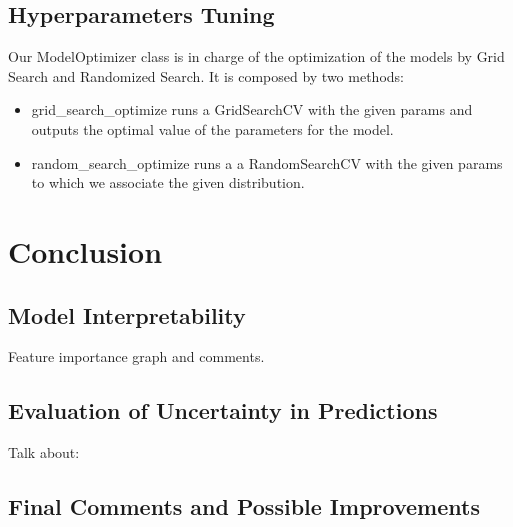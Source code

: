 \documentclass[a4paper,12pt,twoside]{article}
\begin{document}
\subsection{Hyperparameters Tuning}
Our ModelOptimizer class is in charge of the optimization of the models by Grid Search and Randomized Search. It is composed by two methods:
\begin{itemize}
	\item grid\_search\_optimize runs a GridSearchCV with the given params and outputs the optimal value of the parameters for the model.
	\item random\_search\_optimize runs a a RandomSearchCV with the given params to which we associate the given distribution.
\end{itemize}

\section{Conclusion}
\subsection{Model Interpretability}
Feature importance graph and comments.
\subsection{Evaluation of Uncertainty in Predictions}
Talk about: 
\subsection{Final Comments and Possible Improvements}
\end{document}
